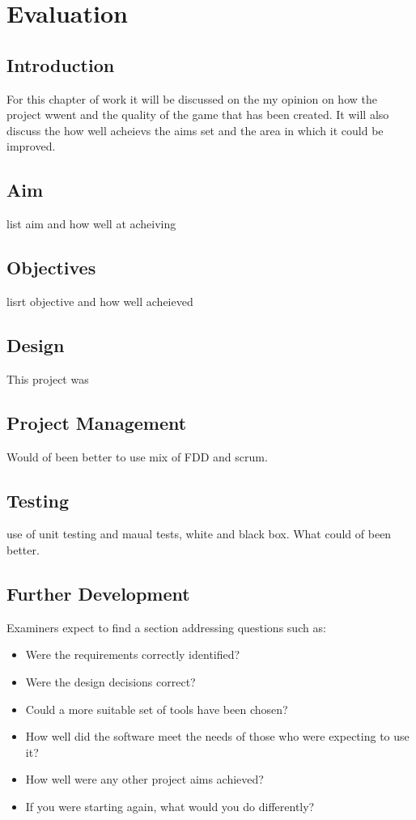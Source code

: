 \chapter{Evaluation}
\section{Introduction}
For this chapter of work it will be discussed on the my opinion on how the project wwent and the quality of the game that has been created. It will also discuss the how well acheievs the aims set and the area in which it could be improved. 
\section{Aim}
list aim and how well at acheiving
\section{Objectives}
lisrt objective and how well acheieved
\section{Design}
This project was 
\section{Project Management}
Would of been better to use mix of FDD and scrum.
\section{Testing}
use of unit testing and maual tests, white and black box. What could of been better.
\section{Further Development}
Examiners expect to find a section addressing questions such as:

\begin{itemize}
   \item Were the requirements correctly identified? 
   \item Were the design decisions correct?
   \item Could a more suitable set of tools have been chosen?
   \item How well did the software meet the needs of those who were expecting to use it?
   \item How well were any other project aims achieved?
   \item If you were starting again, what would you do differently?
\end{itemize}

